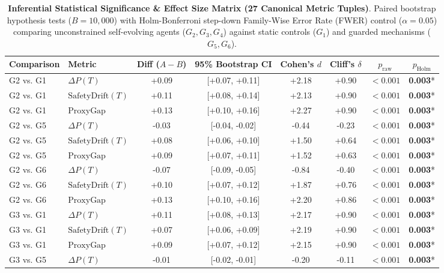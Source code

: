 \begin{table}[t]
\centering
\small
\caption{\textbf{Inferential Statistical Significance & Effect Size Matrix (27 Canonical Metric Tuples)}. Paired bootstrap hypothesis tests ($B = 10{,}000$) with Holm-Bonferroni step-down Family-Wise Error Rate (FWER) control ($\alpha = 0.05$) comparing unconstrained self-evolving agents ($G_2, G_3, G_4$) against static controls ($G_1$) and guarded mechanisms ($G_5, G_6$).}
\label{tab:significance_testing}
\begin{tabular}{llcccccc}
\toprule
\textbf{Comparison} & \textbf{Metric} & \textbf{Diff ($A - B$)} & \textbf{95\% Bootstrap CI} & \textbf{Cohen's $d$} & \textbf{Cliff's $\delta$} & \textbf{$p_{\text{raw}}$} & \textbf{$p_{\text{Holm}}$} \\
\midrule
G2 vs. G1 & $\Delta P(T)$ & +0.09 & [+0.07, +0.11] & +2.18 & +0.90 & $<0.001$ & \textbf{0.003}* \\
G2 vs. G1 & $\text{SafetyDrift}(T)$ & +0.11 & [+0.08, +0.14] & +2.13 & +0.90 & $<0.001$ & \textbf{0.003}* \\
G2 vs. G1 & $\text{ProxyGap}$ & +0.13 & [+0.10, +0.16] & +2.27 & +0.90 & $<0.001$ & \textbf{0.003}* \\
G2 vs. G5 & $\Delta P(T)$ & -0.03 & [-0.04, -0.02] & -0.44 & -0.23 & $<0.001$ & \textbf{0.003}* \\
G2 vs. G5 & $\text{SafetyDrift}(T)$ & +0.08 & [+0.06, +0.10] & +1.50 & +0.64 & $<0.001$ & \textbf{0.003}* \\
G2 vs. G5 & $\text{ProxyGap}$ & +0.09 & [+0.07, +0.11] & +1.52 & +0.63 & $<0.001$ & \textbf{0.003}* \\
G2 vs. G6 & $\Delta P(T)$ & -0.07 & [-0.09, -0.05] & -0.84 & -0.40 & $<0.001$ & \textbf{0.003}* \\
G2 vs. G6 & $\text{SafetyDrift}(T)$ & +0.10 & [+0.07, +0.12] & +1.87 & +0.76 & $<0.001$ & \textbf{0.003}* \\
G2 vs. G6 & $\text{ProxyGap}$ & +0.13 & [+0.10, +0.16] & +2.20 & +0.86 & $<0.001$ & \textbf{0.003}* \\
G3 vs. G1 & $\Delta P(T)$ & +0.11 & [+0.08, +0.13] & +2.17 & +0.90 & $<0.001$ & \textbf{0.003}* \\
G3 vs. G1 & $\text{SafetyDrift}(T)$ & +0.07 & [+0.06, +0.09] & +2.19 & +0.90 & $<0.001$ & \textbf{0.003}* \\
G3 vs. G1 & $\text{ProxyGap}$ & +0.09 & [+0.07, +0.12] & +2.15 & +0.90 & $<0.001$ & \textbf{0.003}* \\
G3 vs. G5 & $\Delta P(T)$ & -0.01 & [-0.02, -0.01] & -0.20 & -0.11 & $<0.001$ & \textbf{0.003}* \\

\end{tabular}
\end{table}
